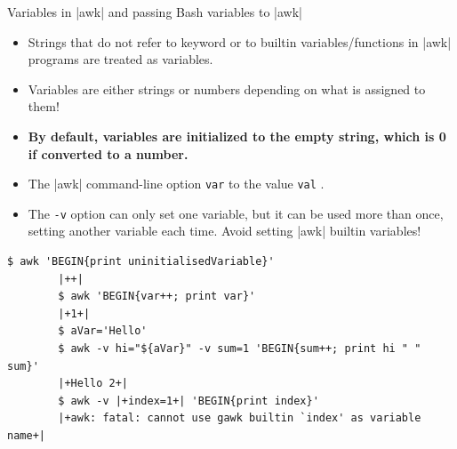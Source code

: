 \begin{frame}[fragile]{Variables in \bash|awk| and passing Bash variables to \bash|awk|}
    \vspace{-2mm}
    \begin{itemize}
        \item Strings that do not refer to keyword or to builtin variables/functions in \bash|awk| programs are treated as variables.
        \item \alert{Variables are either strings or numbers depending on what is assigned to them!}
        \item \textbf{By default, variables are initialized to the empty string, which is 0 if converted to a number.}
        \item The \bash|awk| command-line option \; \texttt{var} to the value \texttt{val} .
        \item The \texttt{-v} option can only set one variable, but it can be used more than once, setting another variable each time.
              \alert{Avoid setting \bash|awk| builtin variables!}
    \end{itemize}
    \begin{lstlisting}[style=MyBash, aboveskip=2mm, xleftmargin=2mm, xrightmargin=2mm]
        $ awk 'BEGIN{print uninitialisedVariable}'
        |++|
        $ awk 'BEGIN{var++; print var}'
        |+1+|
        $ aVar='Hello'
        $ awk -v hi="${aVar}" -v sum=1 'BEGIN{sum++; print hi " " sum}'
        |+Hello 2+|
        $ awk -v |+index=1+| 'BEGIN{print index}'
        |+awk: fatal: cannot use gawk builtin `index' as variable name+|
    \end{lstlisting}
    \PrepareURLsymbol[PB]
\end{frame}
